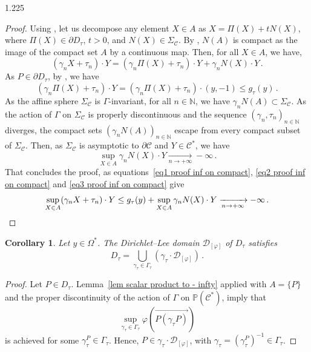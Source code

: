 \documentclass[reqno, a4paper]{amsart}
\numberwithin{equation}{section}
\numberwithin{figure}{section}
\newtheorem{corollary}[theorem]{Corollary}
\theoremstyle{definition}
\theoremstyle{remark}
\newcommand{\N}{\mathbb{N}} %
\renewcommand{\P}{\mathbb{P}} %
\newcommand{\C}{\mathcal{C}} %
\renewcommand{\S}{\Sigma_\C} %
\newcommand{\DL}{\mathcal{D}} %
\newcommand{\vp}[1]{{\left( {#1} \right)}} %
\begin{document}
\begin{spacing}{1.225}
\begin{proof}
Using \cite[Proposition~6.7]{Ablondi_25}, let us decompose any element $X \in A $ as $X = \Pi(X) + t N(X)$, where $ \Pi(X) \in \partial D_\tau$, $t>0$, and $N(X) \in \S$. By \cite[Proposition~6.9]{Ablondi_25}, $N(A)$ is compact as the image of the compact set $A$ by a continuous map. Then, for all $X \in A$, we have,
\begin{equation}
\label{eq1 proof inf on compact}
(\gamma_n X + \tau_n)\cdot Y = (\gamma_n \Pi(X) + \tau_n)\cdot Y + \gamma_n N(X)\cdot Y \, . 
\end{equation}
As $P \in \partial D_\tau$, by \cite[Proposition~5.15]{Ablondi_25}, we have
\begin{equation}
\label{eq2 proof inf on compact}
(\gamma_n \Pi(X) + \tau_n)\cdot Y = (\gamma_n \Pi(X) + \tau_n)\cdot (y,-1) \leq g_\tau(y) \, . 
\end{equation}
As the affine sphere $\S$ is $\Gamma$-invariant, for all $n \in \N$, we have $\gamma_n N(A) \subset \S$. As the action of $\Gamma$ on $\S$ is properly discontinuous and the sequence $(\gamma_n,\tau_n)_{n\in \N}$ diverges, the compact sets $(\gamma_n N(A))_{n\in \N}$ escape from every compact subset of $\S$. Then, as $\S$ is asymptotic to $\partial \C$ and $Y \in \C^*$, we have
\begin{equation}
\label{eq3 proof inf on compact}
\sup_{X \in A} \gamma_n N(X) \cdot Y \xrightarrow[n \to +\infty]{} -\infty \, . 
\end{equation}
That concludes the proof, as equations~\eqref{eq1 proof inf on compact}, \eqref{eq2 proof inf on compact} and \eqref{eq3 proof inf on compact} give
\begin{equation*}
 \sup_{X \in A} (\gamma_n X + \tau_n)\cdot Y \leq g_\tau(y)+ \sup_{X \in A} \gamma_n N(X) \cdot Y\xrightarrow[n \to +\infty]{} -\infty \, . \qedhere
\end{equation*}
\end{proof}

\begin{corollary}
\label{cor1 fundamental domain}
Let $y\in \Omega^*$. The Dirichlet--Lee domain $\DL_{[\varphi]}$ of $D_\tau$ satisfies
\begin{equation*}
 D_\tau =\bigcup_{\gamma_\tau \in \Gamma_\tau} (\gamma_\tau \cdot \DL_{[\varphi]}) \, . 
\end{equation*}
\end{corollary}
\begin{proof}
Let $P \in D_\tau$. Lemma~\ref{lem scalar product to - infty} applied with $A=\{P\}$ and the proper discontinuity of the action of $\Gamma$ on $\P(\C^*)$, imply that \begin{equation*}
\sup_{\gamma_\tau \in \Gamma_\tau}\varphi\vp{\overrightarrow{P(\gamma_\tau P)}}
\end{equation*}
is achieved for some $\gamma_\tau^P \in \Gamma_\tau$. Hence, $P \in \gamma_\tau \cdot \DL_{[\varphi]}$, with $\gamma_\tau = (\gamma_\tau^P)^{-1} \in \Gamma_\tau$. 
\end{proof}


\end{spacing}
\end{document}
